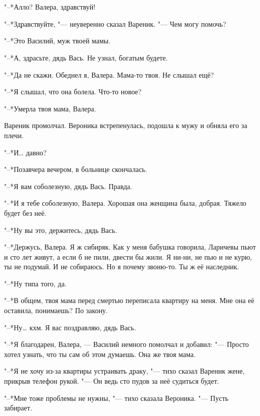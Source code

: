 \chapter{}

\label{Sat_2012_06_02}

\textspace

"--*Алло?
Валера, здравствуй!

"--*Здравствуйте, "--- неуверенно сказал Вареник.
"--- Чем могу помочь?

"--*Это Василий, муж твоей мамы.

"--*А, здрасьте, дядь Вась.
Не узнал, богатым будете.

"--*Да не скажи.
Обеднел я, Валера.
Мама-то твоя.
Не слышал ещё?

"--*Я слышал, что она болела.
Что-то новое?

"--*Умерла твоя мама, Валера.

Вареник промолчал.
Вероника встрепенулась, подошла к мужу и обняла его за плечи.

"--*И\ldots{} давно?

"--*Позавчера вечером, в больнице скончалась.

"--*Я вам соболезную, дядь Вась.
Правда.

"--*И я тебе соболезную, Валера.
Хорошая она женщина была, добрая.
Тяжело будет без неё.

"--*Ну вы это, держитесь, дядь Вась.

"--*Держусь, Валера.
Я ж сибиряк.
Как у меня бабушка говорила, Ларичевы пьют и сто лет живут, а если б не пили, двести бы жили.
Я ни-ни, не пью и не курю, ты не подумай.
И не собираюсь.
Но я почему звоню-то.
Ты ж её наследник.

"--*Ну типа того, да.

"--*В общем, твоя мама перед смертью переписала квартиру на меня.
Мне она её оставила, понимаешь?
По закону.

"--*Ну\ldots{} кхм.
Я вас поздравляю, дядь Вась.

"--*Я благодарен, Валера, --- Василий немного помолчал и добавил:
"--- Просто хотел узнать, что ты сам об этом думаешь.
Она же твоя мама.

"--*Я не хочу из-за квартиры устраивать драку, "--- тихо сказал Вареник жене, прикрыв телефон рукой.
"--- Он ведь сто пудов за неё судиться будет.

"--*Мне тоже проблемы не нужны, "--- тихо сказала Вероника.
"--- Пусть забирает.

